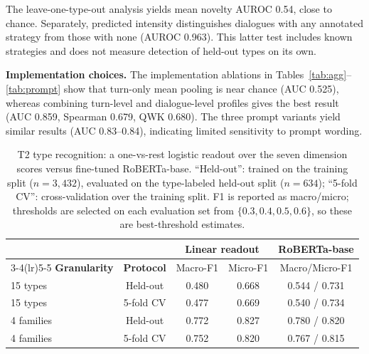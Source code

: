 \documentclass[conference]{IEEEtran}
\begin{document}
The leave-one-type-out analysis yields mean novelty AUROC 0.54, close to
chance. Separately, predicted intensity distinguishes dialogues with any
annotated strategy from those with none (AUROC 0.963). This latter test
includes known strategies and does not measure detection of held-out types
on its own.

\textbf{Implementation choices.}
The implementation ablations in Tables~\ref{tab:agg}--\ref{tab:prompt}
show that turn-only mean pooling is near chance (AUC 0.525), whereas
combining turn-level and dialogue-level profiles gives the best result (AUC
0.859, Spearman 0.679, QWK 0.680). The three prompt variants yield similar
results (AUC 0.83--0.84), indicating limited sensitivity to prompt wording.

\begin{table}[t]
\centering
\caption{T2 type recognition: a one-vs-rest logistic readout over the seven
dimension scores versus fine-tuned RoBERTa-base. ``Held-out'': trained on
the training split ($n{=}3{,}432$), evaluated on the type-labeled held-out
split ($n{=}634$); ``5-fold CV'': cross-validation over the training split.
F1 is reported as macro/micro; thresholds are selected on each evaluation
set from $\{0.3,0.4,0.5,0.6\}$, so these are best-threshold estimates.}
\label{tab:rq2}
\footnotesize
\begin{tabular}{@{}lcccc@{}}
\toprule
& & \multicolumn{2}{c}{Linear readout} & \multicolumn{1}{c}{RoBERTa-base}\\
\cmidrule(lr){3-4}\cmidrule(lr){5-5}
\textbf{Granularity} & \textbf{Protocol} & Macro-F1 & Micro-F1 & Macro/Micro-F1\\
\midrule
15 types & Held-out & 0.480 & 0.668 & 0.544 / 0.731\\
15 types & 5-fold CV & 0.477 & 0.669 & 0.540 / 0.734\\
4 families & Held-out & 0.772 & 0.827 & 0.780 / 0.820\\
4 families & 5-fold CV & 0.752 & 0.820 & 0.767 / 0.815\\
\bottomrule
\end{tabular}
\end{table}
\end{document}
